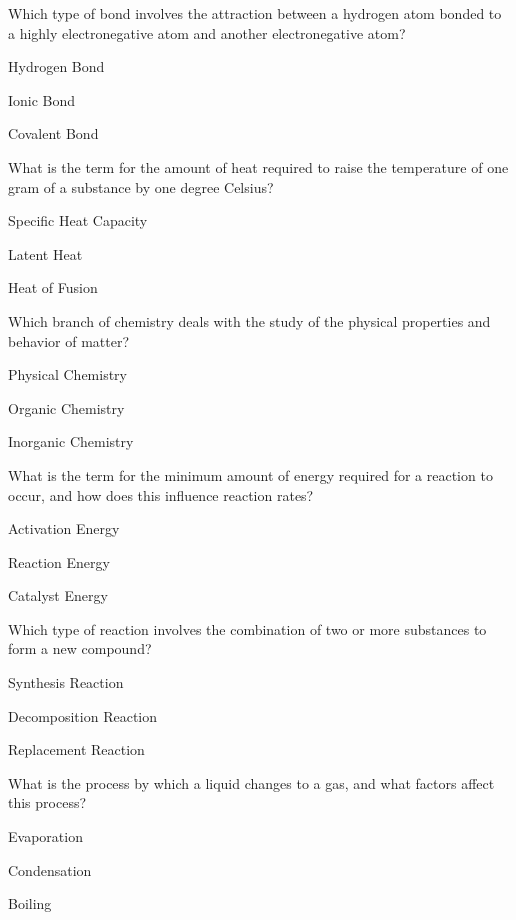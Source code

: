 \begin{enhancedmcq}{Which type of bond involves the attraction between a hydrogen atom bonded to a highly electronegative atom and another electronegative atom?}
\item Hydrogen Bond
\item Ionic Bond
\item Covalent Bond

\end{enhancedmcq}
\begin{enhancedmcq}{What is the term for the amount of heat required to raise the temperature of one gram of a substance by one degree Celsius?}
\item Specific Heat Capacity
\item Latent Heat
\item Heat of Fusion

\end{enhancedmcq}
\begin{enhancedmcq}{Which branch of chemistry deals with the study of the physical properties and behavior of matter?}
\item Physical Chemistry
\item Organic Chemistry
\item Inorganic Chemistry

\end{enhancedmcq}
\begin{enhancedmcq}{What is the term for the minimum amount of energy required for a reaction to occur, and how does this influence reaction rates?}
\item Activation Energy
\item Reaction Energy
\item Catalyst Energy

\end{enhancedmcq}
\begin{enhancedmcq}{Which type of reaction involves the combination of two or more substances to form a new compound?}
\item Synthesis Reaction
\item Decomposition Reaction
\item Replacement Reaction

\end{enhancedmcq}
\begin{enhancedmcq}{What is the process by which a liquid changes to a gas, and what factors affect this process?}
\item Evaporation
\item Condensation
\item Boiling

\end{enhancedmcq}
